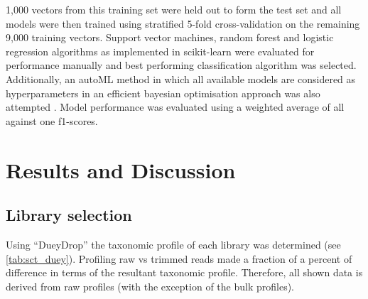 1,000 vectors from this training set were held out to form the test set and all models were then trained
using stratified 5-fold cross-validation on the remaining 9,000 training vectors. 
Support vector machines, random forest and logistic regression algorithms as implemented in scikit-learn 
were evaluated for performance manually and best performing classification algorithm was selected.
Additionally, an autoML method in which all available models are considered as hyperparameters in an efficient
bayesian optimisation approach was also attempted \citep{Komer2014}. 
Model performance was evaluated using a weighted average of all against one f1-scores.

\section{Results and Discussion} 

\subsection{Library selection}
Using ``DueyDrop'' the taxonomic profile of each library was determined (see \ref{tab:sct_duey}).
Profiling raw vs trimmed reads made a fraction of a percent of difference in terms of the resultant taxonomic profile. Therefore, all 
shown data is derived from raw profiles (with the exception of the bulk profiles).

